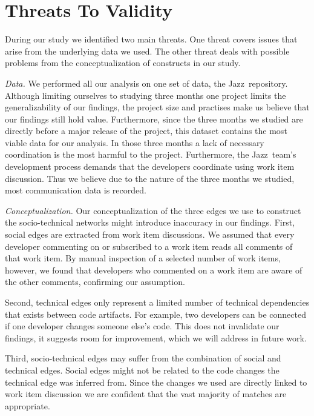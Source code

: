\documentclass[conference]{IEEEtran}
\begin{document}
\section{Threats To Validity}
\label{sec:threats}
During our study we identified two main threats. 
One threat covers issues that arise from the underlying data we used.
The other threat deals with possible problems from the conceptualization of
constructs in our study.

\emph{Data.}
We performed all our analysis on one set of data, the Jazz\texttrademark\
repository. 
Although limiting ourselves to studying three months one project limits the generalizability of our findings, the  
project size and practises make us believe that our findings still hold value.
Furthermore, since the three months  we studied are directly before a major release of the project, this dataset contains the most viable data for our analysis. In those three months a lack of necessary coordination is the most harmful to the project.
Furthermore, the Jazz\texttrademark\ team's development process demands that the developers
coordinate using work item discussion. 
Thus we believe due to the nature of the three months we studied, most communication data is recorded.

\emph{Conceptualization.}
Our conceptualization of the three edges we use to construct the socio-technical networks might introduce inaccuracy in our findings.
First, social edges are extracted from work item discussions. 
We assumed that every developer commenting on or subscribed to a work item reads all comments of that work item. 
By manual inspection of a selected number of work items, however, we found that developers who commented on a work item are aware of the other comments, confirming our assumption.

Second, technical edges only represent a limited number of technical dependencies that exists between code artifacts. 
For example, two developers can be connected if one developer changes someone else's code. 
This does not invalidate our findings, it suggests room for improvement, which we will address in future work.

Third, socio-technical edges may suffer from the combination of social and technical edges. 
Social edges might not be related to the code changes the technical edge was inferred from.
Since the changes we used are directly linked to work item discussion we are confident that the vast majority of matches are appropriate.
\end{document}
